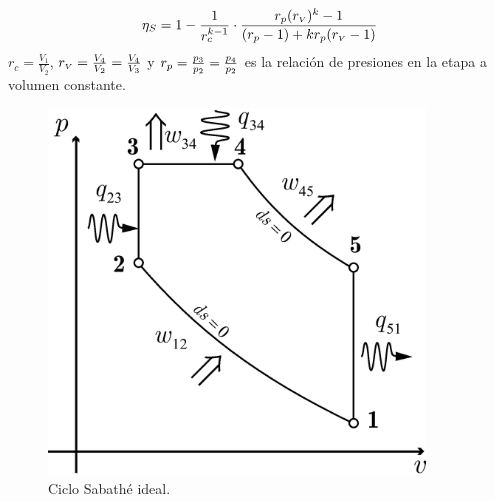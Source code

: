 \documentclass{article}
\newcommand{\ctegas}{k}
\newcommand{\rc}{r_c}
\newcommand{\rp}{r_{\mbox{\scriptsize$p$}}}
\newcommand{\rv}{r_{\mbox{\tiny$V$}}}
\begin{document}
\begin{equation}
\eta_S=1-\frac{1}{\rc^{\ctegas -1}}\cdot \frac{\rp(\rv)^\ctegas-1}{(\rp -1)+\ctegas\rp(\rv-1)}
\end{equation}
$\rc=\frac{V_1}{V_2}$, $\rv=\frac{V_4}{V_2}=\frac{V_4}{V_3}$ y $\rp=\frac{p_3}{p_2}=\frac{p_4}{p_2}$ es la relación de presiones en la etapa a volumen constante.
\begin{figure}[htb!]
    \centering
    \includegraphics[width=10cm]{fig/ciclodual.eps}
    \caption{Ciclo Sabathé ideal.}
    \label{fig:dualideal}
\end{figure}
\end{document}
